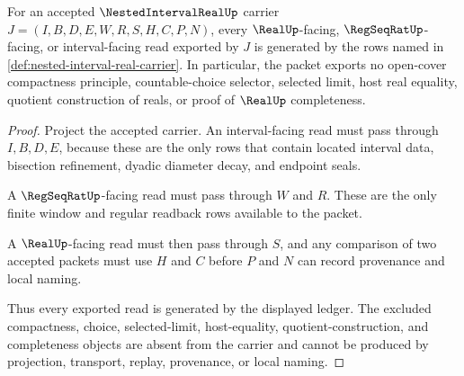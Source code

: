 \begin{theorem}
\label{thm:nested-interval-real-ledger-nonescape}
For an accepted $\NestedIntervalRealUp$ carrier $J=(I,B,D,E,W,R,S,H,C,P,N)$, every $\RealUp$-facing, $\RegSeqRatUp$-facing, or interval-facing read exported by $J$ is generated by the rows named in \autoref{def:nested-interval-real-carrier}. In particular, the packet exports no open-cover compactness principle, countable-choice selector, selected limit, host real equality, quotient construction of reals, or proof of $\RealUp$ completeness.
\end{theorem}
\begin{proof}
Project the accepted carrier. An interval-facing read must pass through $I,B,D,E$, because these are the only rows that contain located interval data, bisection refinement, dyadic diameter decay, and endpoint seals.

A $\RegSeqRatUp$-facing read must pass through $W$ and $R$. These are the only finite window and regular readback rows available to the packet.

A $\RealUp$-facing read must then pass through $S$, and any comparison of two accepted packets must use $H$ and $C$ before $P$ and $N$ can record provenance and local naming.

Thus every exported read is generated by the displayed ledger. The excluded compactness, choice, selected-limit, host-equality, quotient-construction, and completeness objects are absent from the carrier and cannot be produced by projection, transport, replay, provenance, or local naming.
\end{proof}


\begin{closurestatus}{\NestedIntervalRealUp}
  \theoryclosure{\seedClosure}
  \formalstatus{\unformalizedV}
\end{closurestatus}
